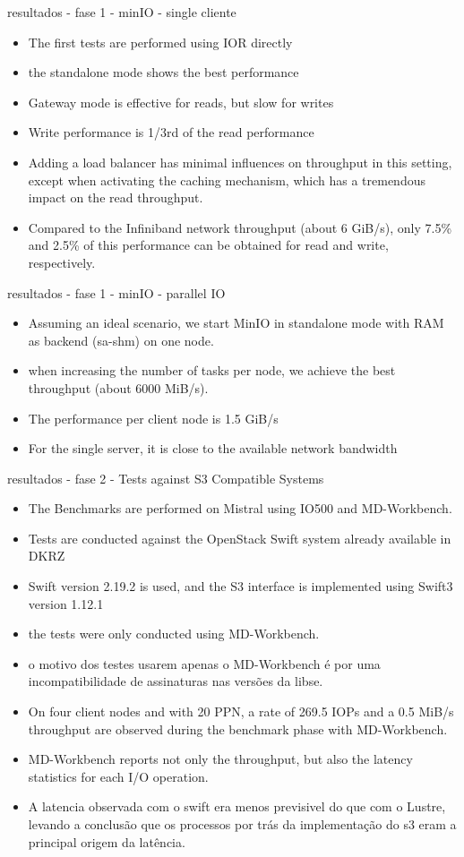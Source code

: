 \documentclass{beamer}
\begin{document}
\begin{frame}{resultados - fase 1 - minIO - single cliente}
	\begin{itemize}
		\item The first tests are performed using IOR directly
		\item the standalone mode shows the best performance
		\item Gateway mode is effective for reads,
		but slow for writes
		\item Write performance is 1/3rd of the read performance
		\item Adding a load balancer has minimal
		influences on throughput in this setting, except when activating the caching mechanism,
		which has a tremendous impact on the read throughput.
		\item Compared to the
		Infiniband network throughput (about 6 GiB/s), only 7.5\% and 2.5\% of this performance
		can be obtained for read and write, respectively.
	\end{itemize}
\end{frame}
\begin{frame}{resultados - fase 1 - minIO - parallel IO}
	\begin{itemize}
		\item Assuming an ideal scenario, we
		start MinIO in standalone mode with RAM as backend (sa-shm) on one node.
		\item when increasing the number of tasks per node, we achieve the best
		throughput (about 6000 MiB/s).
		\item The performance per client node is 1.5 GiB/s
		\item For the
		single server, it is close to the available network bandwidth
	\end{itemize}
\end{frame}
\begin{frame}{resultados - fase 2 - Tests against S3 Compatible Systems}
	\begin{itemize}
		\item The Benchmarks are performed on Mistral using IO500 and MD-Workbench.
		\item Tests are conducted against the OpenStack Swift system already available in DKRZ
		\item Swift version 2.19.2 is used, and the S3 interface is implemented using Swift3 version 1.12.1
		\item the tests were only conducted using MD-Workbench.
		\item o motivo dos testes usarem apenas o MD-Workbench é por uma incompatibilidade de assinaturas nas versões da libse.
		\item On
		four client nodes and with 20 PPN, a rate of 269.5 IOPs and a 0.5 MiB/s throughput are
		observed during the benchmark phase with MD-Workbench.
		\item MD-Workbench reports not only the throughput, but also the latency statistics for
		each I/O operation.
		\item A latencia observada com o swift era menos previsivel do que com o Lustre, levando a conclusão que os processos por trás da implementação do s3 eram a principal origem da latência.
	\end{itemize}
\end{frame}
\end{document}
